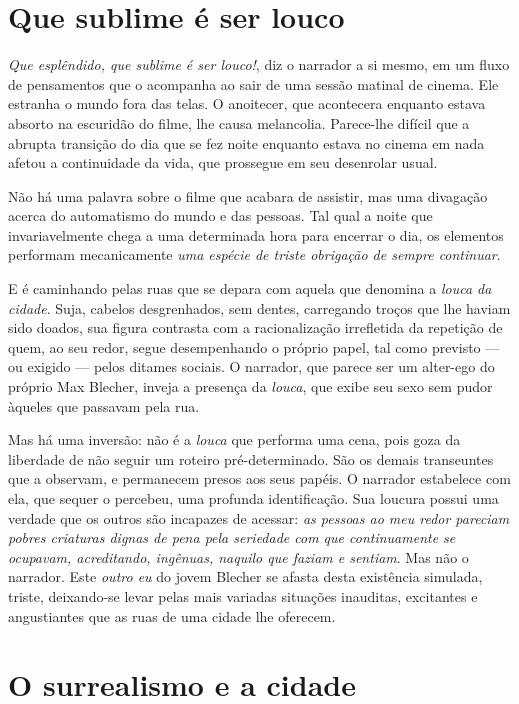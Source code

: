 \section{Que sublime é ser louco}

\textit{Que esplêndido, que sublime é ser louco!}, diz o narrador a si mesmo, em um fluxo de pensamentos que o acompanha ao sair de uma sessão matinal de cinema. Ele estranha o mundo fora das telas. O anoitecer, que acontecera enquanto estava absorto na escuridão do filme, lhe causa melancolia. Parece-lhe difícil que a abrupta transição do dia que se fez noite enquanto estava no cinema em nada afetou a continuidade da vida, que prossegue em seu desenrolar usual.

Não há uma palavra sobre o filme que acabara de assistir, mas uma divagação acerca do automatismo do mundo e das pessoas. Tal qual a noite que invariavelmente chega a uma determinada hora para encerrar o dia, os elementos performam mecanicamente \textit{uma espécie de triste obrigação de sempre continuar}.

E é caminhando pelas ruas que se depara com aquela que denomina a \textit{louca da cidade}. Suja, cabelos desgrenhados, sem dentes, carregando troços que lhe haviam sido doados, sua figura contrasta com a racionalização irrefletida da repetição de quem, ao seu redor, segue desempenhando o próprio papel, tal como previsto --- ou exigido --- pelos ditames sociais. O narrador, que parece ser um alter-ego do próprio Max Blecher, inveja a presença da \textit{louca}, que exibe seu sexo sem pudor àqueles que passavam pela rua.

Mas há uma inversão: não é a \textit{louca} que performa uma cena, pois goza da liberdade de não seguir um roteiro pré-determinado. São os demais transeuntes que a observam, e permanecem presos aos seus papéis. O narrador estabelece com ela, que sequer o percebeu, uma profunda identificação. Sua loucura possui uma verdade que os outros são incapazes de acessar: \textit{as pessoas ao meu redor pareciam pobres criaturas dignas de pena pela seriedade com que continuamente se ocupavam, acreditando, ingênuas, naquilo que faziam e sentiam}. Mas não o narrador. Este \textit{outro eu} do jovem Blecher se afasta desta existência simulada, triste, deixando-se levar pelas mais variadas situações inauditas, excitantes e angustiantes que as ruas de uma cidade lhe oferecem. 

\section{O surrealismo e a cidade}


